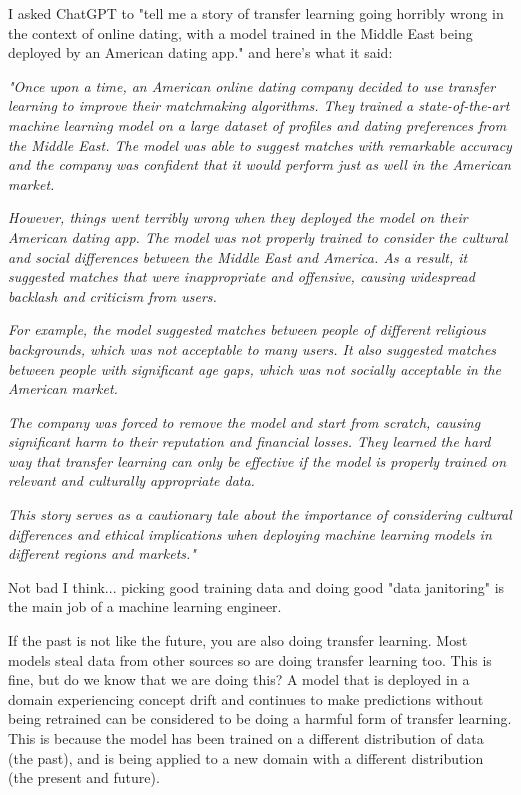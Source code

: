 I asked ChatGPT to "tell me a story of transfer learning going horribly wrong in the context of online dating, with a model trained in the Middle East being deployed by an American dating app." and here's what it said:

\textit{"Once upon a time, an American online dating company decided to use transfer learning to improve their matchmaking algorithms. They trained a state-of-the-art machine learning model on a large dataset of profiles and dating preferences from the Middle East. The model was able to suggest matches with remarkable accuracy and the company was confident that it would perform just as well in the American market.}

\textit{However, things went terribly wrong when they deployed the model on their American dating app. The model was not properly trained to consider the cultural and social differences between the Middle East and America. As a result, it suggested matches that were inappropriate and offensive, causing widespread backlash and criticism from users.}

\textit{For example, the model suggested matches between people of different religious backgrounds, which was not acceptable to many users. It also suggested matches between people with significant age gaps, which was not socially acceptable in the American market.}

\textit{The company was forced to remove the model and start from scratch, causing significant harm to their reputation and financial losses. They learned the hard way that transfer learning can only be effective if the model is properly trained on relevant and culturally appropriate data.}

\textit{This story serves as a cautionary tale about the importance of considering cultural differences and ethical implications when deploying machine learning models in different regions and markets."}

Not bad I think... picking good training data and doing good "data janitoring" is the main job of a machine learning engineer.

If the past is not like the future, you are also doing transfer learning. Most models steal data from other sources so are doing transfer learning too. This is fine, but do we know that we are doing this? A model that is deployed in a domain experiencing concept drift and continues to make predictions without being retrained can be considered to be doing a harmful form of transfer learning. This is because the model has been trained on a different distribution of data (the past), and is being applied to a new domain with a different distribution (the present and future).

